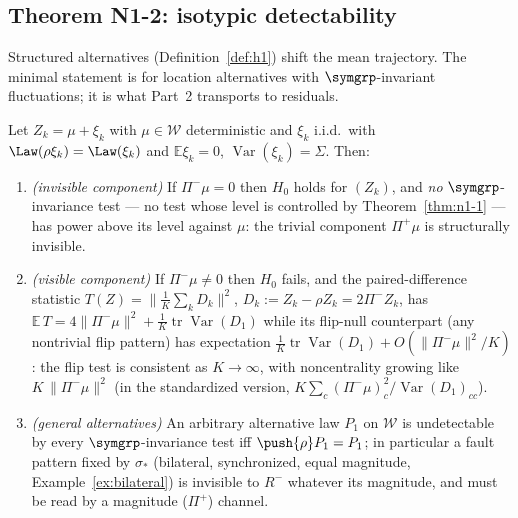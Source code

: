 \subsection{Theorem N1-2: isotypic detectability}
\label{sec:n1-2}

Structured alternatives (Definition~\ref{def:h1}) shift the mean trajectory.
The minimal statement is for location alternatives with $\symgrp$-invariant
fluctuations; it is what Part~2 transports to residuals.

\begin{theorem}
\label{thm:n1-2}
Let $Z_k = \mu + \xi_k$ with $\mu \in \mathcal{W}$ deterministic and
$\xi_k$ i.i.d.\ with $\Law(\rho \xi_k) = \Law(\xi_k)$ and
$\mathbb{E}\xi_k = 0$, $\operatorname{Var}(\xi_k) = \Sigma$. Then:
\begin{enumerate}
  \item[(i)] \emph{(invisible component)} If $\Pi^{-}\mu = 0$ then $H_0$
  holds for $(Z_k)$, and \emph{no} $\symgrp$-invariance test --- no test
  whose level is controlled by Theorem~\ref{thm:n1-1} --- has power above its
  level against $\mu$: the trivial component $\Pi^{+}\mu$ is structurally
  invisible.
  \item[(ii)] \emph{(visible component)} If $\Pi^{-}\mu \neq 0$ then $H_0$
  fails, and the paired-difference statistic
  $T(Z) = \|\tfrac1K \sum_k D_k\|^2$, $D_k := Z_k - \rho Z_k = 2\Pi^{-}Z_k$,
  has $\mathbb{E}\,T = 4\|\Pi^{-}\mu\|^2 + \tfrac{1}{K}\operatorname{tr}
  \operatorname{Var}(D_1)$ while its flip-null counterpart (any nontrivial
  flip pattern) has expectation $\tfrac{1}{K}\operatorname{tr}\operatorname{Var}(D_1)
  + O(\|\Pi^-\mu\|^2/K)$: the flip test is consistent as $K \to \infty$, with
  noncentrality growing like $K\,\|\Pi^{-}\mu\|^{2}$ (in the standardized
  version, $K \sum_c (\Pi^-\mu)_c^2 / \operatorname{Var}(D_1)_{cc}$).
  \item[(iii)] \emph{(general alternatives)} An arbitrary alternative law
  $P_1$ on $\mathcal{W}$ is undetectable by every $\symgrp$-invariance test
  iff $\push{\rho} P_1 = P_1$; in particular a fault pattern fixed by
  $\sigma_*$ (bilateral, synchronized, equal magnitude,
  Example~\ref{ex:bilateral}) is invisible to $R^{-}$ whatever its magnitude,
  and must be read by a magnitude ($\Pi^{+}$) channel.
\end{enumerate}
\end{theorem}

